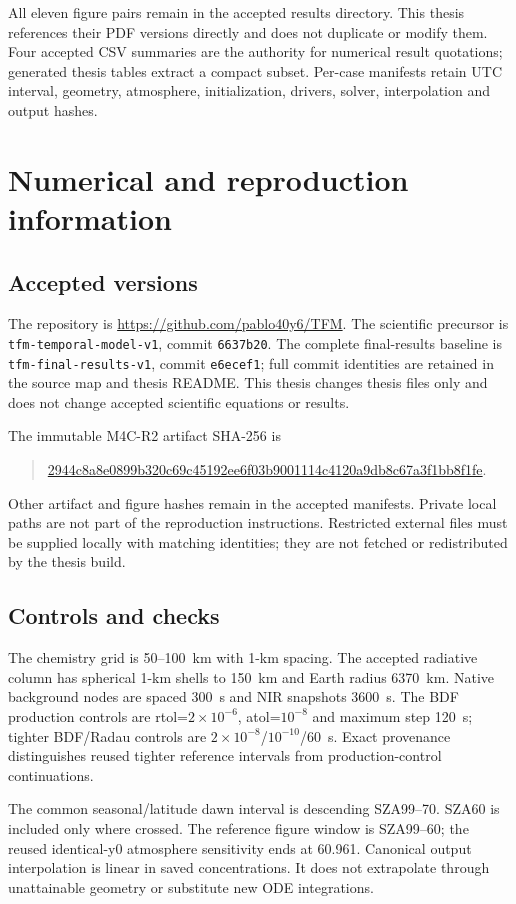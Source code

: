 All eleven figure pairs remain in the accepted results directory. This thesis references their PDF versions directly and does not duplicate or modify them. Four accepted CSV summaries are the authority for numerical result quotations; generated thesis tables extract a compact subset. Per-case manifests retain UTC interval, geometry, atmosphere, initialization, drivers, solver, interpolation and output hashes.

\chapter{Numerical and reproduction information}\label{app:reproduction}
\section{Accepted versions}
The repository is \url{https://github.com/pablo40y6/TFM}. The scientific precursor is \texttt{tfm-temporal-model-v1}, commit \texttt{6637b20}. The complete final-results baseline is \texttt{tfm-final-results-v1}, commit \texttt{e6ecef1}; full commit identities are retained in the source map and thesis README. This thesis changes thesis files only and does not change accepted scientific equations or results.

The immutable M4C-R2 artifact SHA-256 is
\begin{quote}\footnotesize\url{2944c8a8e0899b320c69c45192ee6f03b9001114c4120a9db8c67a3f1bb8f1fe}.\end{quote}
Other artifact and figure hashes remain in the accepted manifests. Private local paths are not part of the reproduction instructions. Restricted external files must be supplied locally with matching identities; they are not fetched or redistributed by the thesis build.

\section{Controls and checks}
The chemistry grid is 50--100~km with 1-km spacing. The accepted radiative column has spherical 1-km shells to 150~km and Earth radius 6370~km. Native background nodes are spaced 300~s and NIR snapshots 3600~s. The BDF production controls are rtol=$2\times10^{-6}$, atol=$10^{-8}$ and maximum step 120~s; tighter BDF/Radau controls are $2\times10^{-8}$/$10^{-10}$/60~s. Exact provenance distinguishes reused tighter reference intervals from production-control continuations.

The common seasonal/latitude dawn interval is descending SZA99--70. SZA60 is included only where crossed. The reference figure window is SZA99--60; the reused identical-y0 atmosphere sensitivity ends at 60.961. Canonical output interpolation is linear in saved concentrations. It does not extrapolate through unattainable geometry or substitute new ODE integrations.


